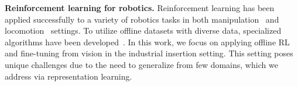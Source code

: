\documentclass{article}
\begin{document}
\textbf{Reinforcement learning for robotics.}
Reinforcement learning has been applied successfully to a variety of robotics tasks in both manipulation~\cite{peters2008baseball, kober2008mp,deisenroth2011pilco, levine2016gps, levine2017grasping} and locomotion~\cite{giusti15trails, nakanishi2004bipedlfd, kalakrishnan09terraintemplates} settings.
To utilize offline datasets with diverse data, specialized algorithms have been developed~\cite{chebotar2021actionable, kalashnikov2021mtopt, nair2020awac}.
In this work, we focus on applying offline RL and fine-tuning from vision in the industrial insertion setting.
This setting poses unique challenges due to the need to generalize from few domains, which we address via representation learning.
\end{document}
